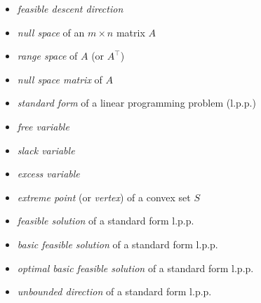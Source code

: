 \documentclass[12pt]{amsart}
\begin{document}
\begin{itemize}
\item \emph{feasible descent direction} \pb
\item \emph{null space} of an $m\times n$ matrix $A$ \pb
\item \emph{range space} of $A$ (or $A^\top$) \pb
\item \emph{null space matrix} of $A$ \pb
\item \emph{standard form} of a linear programming problem (l.p.p.) \pb
\item \emph{free variable} \pb
\item \emph{slack variable} \pb
\item \emph{excess variable} \pb
\item \emph{extreme point} (or \emph{vertex}) of a convex set $S$ \pb
\item \emph{feasible solution} of a standard form l.p.p. \pb
\item \emph{basic feasible solution} of a standard form l.p.p. \pb
\item \emph{optimal basic feasible solution} of a standard form l.p.p. \pb
\item \emph{unbounded direction} of a standard form l.p.p. \pb
\end{itemize}

\vspace{10mm}

\newcommand{\pg}[1]{\hfill p.~#1}
\newcommand{\pgs}[1]{\hfill pp.~#1}
\end{document}
